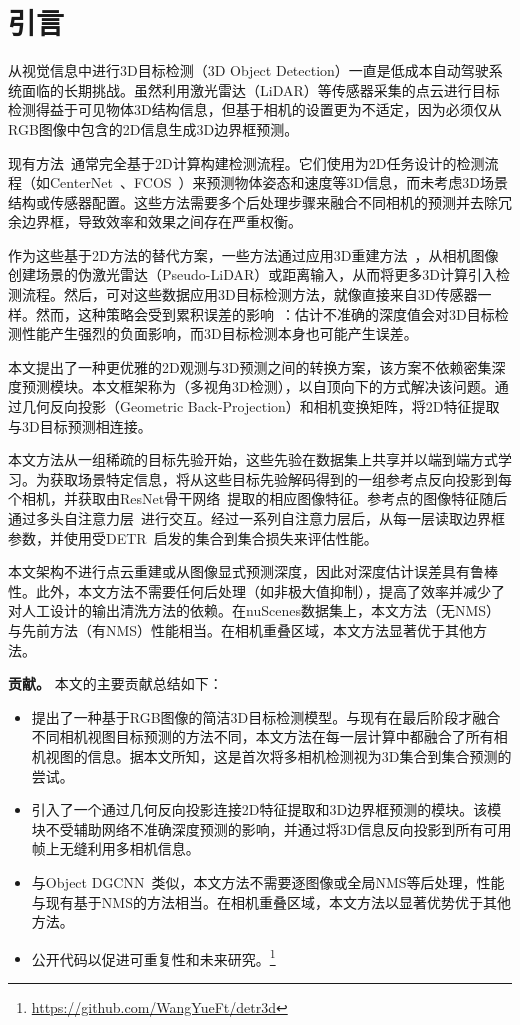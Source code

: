 \section{引言}

从视觉信息中进行3D目标检测（3D Object Detection）一直是低成本自动驾驶系统面临的长期挑战。虽然利用激光雷达（LiDAR）等传感器采集的点云进行目标检测得益于可见物体3D结构信息，但基于相机的设置更为不适定，因为必须仅从RGB图像中包含的2D信息生成3D边界框预测。

现有方法~\cite{zhou2019centernet,wang2021fcos3d}通常完全基于2D计算构建检测流程。它们使用为2D任务设计的检测流程（如CenterNet~\cite{zhou2019centernet}、FCOS~\cite{tian2019fcos}）来预测物体姿态和速度等3D信息，而未考虑3D场景结构或传感器配置。这些方法需要多个后处理步骤来融合不同相机的预测并去除冗余边界框，导致效率和效果之间存在严重权衡。

作为这些基于2D方法的替代方案，一些方法通过应用3D重建方法~\cite{monodepth2,bts,packnet}，从相机图像创建场景的伪激光雷达（Pseudo-LiDAR）或距离输入，从而将更多3D计算引入检测流程。然后，可对这些数据应用3D目标检测方法，就像直接来自3D传感器一样。然而，这种策略会受到累积误差的影响~\cite{demistifying}：估计不准确的深度值会对3D目标检测性能产生强烈的负面影响，而3D目标检测本身也可能产生误差。

本文提出了一种更优雅的2D观测与3D预测之间的转换方案，该方案不依赖密集深度预测模块。本文框架称为\name（多视角3D检测），以自顶向下的方式解决该问题。通过几何反向投影（Geometric Back-Projection）和相机变换矩阵，将2D特征提取与3D目标预测相连接。

本文方法从一组稀疏的目标先验开始，这些先验在数据集上共享并以端到端方式学习。为获取场景特定信息，将从这些目标先验解码得到的一组参考点反向投影到每个相机，并获取由ResNet骨干网络~\cite{He2015}提取的相应图像特征。参考点的图像特征随后通过多头自注意力层~\cite{Vaswani2017}进行交互。经过一系列自注意力层后，从每一层读取边界框参数，并使用受DETR~\cite{detr}启发的集合到集合损失来评估性能。

本文架构不进行点云重建或从图像显式预测深度，因此对深度估计误差具有鲁棒性。此外，本文方法不需要任何后处理（如非极大值抑制），提高了效率并减少了对人工设计的输出清洗方法的依赖。在nuScenes数据集上，本文方法（无NMS）与先前方法（有NMS）性能相当。在相机重叠区域，本文方法显著优于其他方法。

\textbf{贡献。} 本文的主要贡献总结如下：
\begin{itemize}
  \item 提出了一种基于RGB图像的简洁3D目标检测模型。与现有在最后阶段才融合不同相机视图目标预测的方法不同，本文方法在每一层计算中都融合了所有相机视图的信息。据本文所知，这是首次将多相机检测视为3D集合到集合预测的尝试。
  \item 引入了一个通过几何反向投影连接2D特征提取和3D边界框预测的模块。该模块不受辅助网络不准确深度预测的影响，并通过将3D信息反向投影到所有可用帧上无缝利用多相机信息。
  \item 与Object DGCNN~\cite{objdgcnn}类似，本文方法不需要逐图像或全局NMS等后处理，性能与现有基于NMS的方法相当。在相机重叠区域，本文方法以显著优势优于其他方法。
  \item 公开代码以促进可重复性和未来研究。\footnote{\url{https://github.com/WangYueFt/detr3d}}
\end{itemize}
